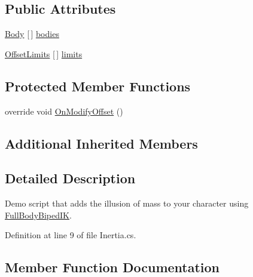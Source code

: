 \subsection*{Public Attributes}
\begin{DoxyCompactItemize}
\item 
\mbox{\hyperlink{class_root_motion_1_1_final_i_k_1_1_inertia_1_1_body}{Body}} \mbox{[}$\,$\mbox{]} \mbox{\hyperlink{class_root_motion_1_1_final_i_k_1_1_inertia_a986b39668a3e043ea8804b8eeebf9ccc}{bodies}}
\item 
\mbox{\hyperlink{class_root_motion_1_1_final_i_k_1_1_offset_modifier_1_1_offset_limits}{Offset\+Limits}} \mbox{[}$\,$\mbox{]} \mbox{\hyperlink{class_root_motion_1_1_final_i_k_1_1_inertia_ad997e6d5f8d9565d489d24fae6c910a2}{limits}}
\end{DoxyCompactItemize}
\subsection*{Protected Member Functions}
\begin{DoxyCompactItemize}
\item 
override void \mbox{\hyperlink{class_root_motion_1_1_final_i_k_1_1_inertia_a98c184eccf6d8b46f5705f0611263b3e}{On\+Modify\+Offset}} ()
\end{DoxyCompactItemize}
\subsection*{Additional Inherited Members}


\subsection{Detailed Description}
Demo script that adds the illusion of mass to your character using \mbox{\hyperlink{class_root_motion_1_1_final_i_k_1_1_full_body_biped_i_k}{Full\+Body\+Biped\+IK}}. 



Definition at line 9 of file Inertia.\+cs.



\subsection{Member Function Documentation}
\mbox{\label{class_root_motion_1_1_final_i_k_1_1_inertia_a98c184eccf6d8b46f5705f0611263b3e}} 
